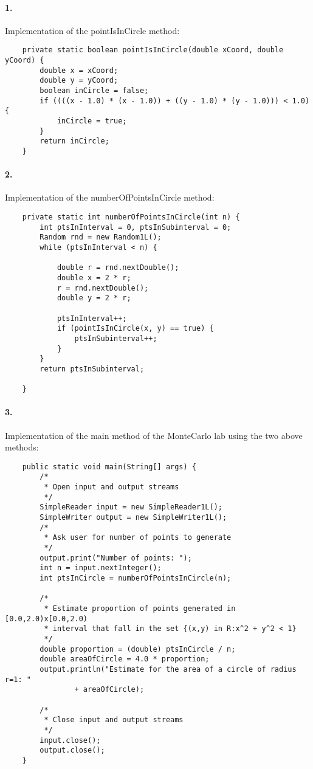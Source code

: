 \documentclass[10pt]{article}
\begin{document}
\maketitle




\paragraph{1. } { }
Implementation of the pointIsInCircle method: 
\begin{lstlisting}
    private static boolean pointIsInCircle(double xCoord, double yCoord) {
        double x = xCoord;
        double y = yCoord;
        boolean inCircle = false;
        if ((((x - 1.0) * (x - 1.0)) + ((y - 1.0) * (y - 1.0))) < 1.0) {
            inCircle = true;
        }
        return inCircle;
    }
\end{lstlisting}

\paragraph{2. } { }
Implementation of the numberOfPointsInCircle method: 
\begin{lstlisting}
    private static int numberOfPointsInCircle(int n) {
        int ptsInInterval = 0, ptsInSubinterval = 0;
        Random rnd = new Random1L();
        while (ptsInInterval < n) {

            double r = rnd.nextDouble();
            double x = 2 * r;
            r = rnd.nextDouble();
            double y = 2 * r;

            ptsInInterval++;
            if (pointIsInCircle(x, y) == true) {
                ptsInSubinterval++;
            }
        }
        return ptsInSubinterval;

    }
\end{lstlisting}

\paragraph{3. } { }
Implementation of the main method of the MonteCarlo lab using the two above methods: 
\begin{lstlisting}
    public static void main(String[] args) {
        /*
         * Open input and output streams
         */
        SimpleReader input = new SimpleReader1L();
        SimpleWriter output = new SimpleWriter1L();
        /*
         * Ask user for number of points to generate
         */
        output.print("Number of points: ");
        int n = input.nextInteger();
        int ptsInCircle = numberOfPointsInCircle(n);

        /*
         * Estimate proportion of points generated in [0.0,2.0)x[0.0,2.0)
         * interval that fall in the set {(x,y) in R:x^2 + y^2 < 1}
         */
        double proportion = (double) ptsInCircle / n;
        double areaOfCircle = 4.0 * proportion;
        output.println("Estimate for the area of a circle of radius r=1: "
                + areaOfCircle);

        /*
         * Close input and output streams
         */
        input.close();
        output.close();
    }
\end{lstlisting}
\end{document}
